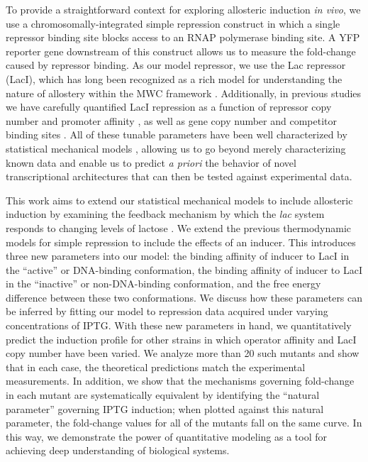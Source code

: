 To provide a straightforward context for exploring allosteric induction \textit{in vivo}, we use a chromosomally-integrated simple repression construct in which a single repressor binding site blocks access to an RNAP polymerase binding site. A YFP reporter gene downstream of this construct allows us to measure the fold-change caused by repressor binding. As our model repressor, we use the Lac repressor (LacI), which has long been recognized as a rich model  for understanding the nature of allostery within the MWC framework \cite{Daly1986, Dunaway1980, Meyer2013, Daber2007, Daber2009, Muller-Hartmann1996, OGorman1980, Sharp2011, Taraban2008, Wilson2007}. Additionally, in previous studies we have carefully quantified LacI repression as a function of repressor copy number and promoter
affinity \cite{Garcia2011}, as well as gene copy number and competitor binding
sites \cite{Weinert2014}. All of these tunable parameters have been well
characterized by statistical mechanical models \cite{Bintu2005a, Bintu2005b}, allowing us to go beyond merely characterizing known data
and enable us to predict \textit{a priori} the behavior of novel transcriptional
architectures that can then be tested against experimental data.

This work aims to extend our statistical mechanical models to include
allosteric induction by examining the
feedback mechanism by which the \textit{lac} system responds to changing levels
of lactose \cite{JACOB1961}. We extend the previous thermodynamic models for
simple repression to include the effects of an inducer. This introduces three
new parameters into our model: the binding affinity of inducer to LacI in the
``active'' or DNA-binding conformation, the binding affinity of inducer to LacI
in the ``inactive'' or non-DNA-binding conformation, and the free energy
difference between these two conformations. We discuss how these parameters can
be inferred by fitting our model to repression data acquired under varying
concentrations of IPTG. With these new parameters in hand, we quantitatively
predict the induction profile for other strains in which operator affinity and
LacI copy number have been varied. We analyze more than 20 such mutants and show
that in each case, the theoretical predictions match the experimental
measurements. In addition, we show that the mechanisms governing fold-change in
each mutant are systematically equivalent by identifying the ``natural
parameter'' governing IPTG induction; when plotted against this natural
parameter, the fold-change values for all of the mutants fall on the same curve.
In this way, we demonstrate the power of quantitative modeling as a tool for
achieving deep understanding of biological systems.

